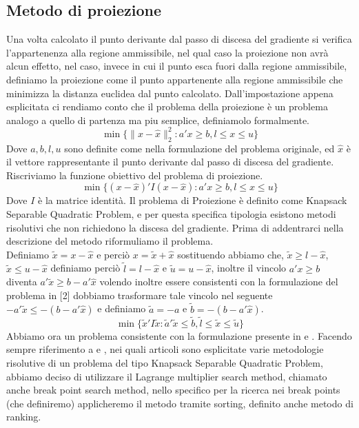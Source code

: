 \documentclass{article}
\begin{document}
\subsection{Metodo di proiezione}
Una volta calcolato il punto derivante dal passo di discesa del gradiente si verifica l'appartenenza alla regione ammissibile, nel qual caso la proiezione non avrà alcun effetto, nel caso, invece in cui il punto esca fuori dalla regione ammissibile, definiamo la proiezione come il punto appartenente alla regione ammissibile che minimizza la distanza euclidea dal punto calcolato. Dall'impostazione appena esplicitata ci rendiamo conto che il problema della proiezione è un problema analogo a quello di partenza ma piu semplice, definiamolo formalmente.
\[\min \{\|x - \hat{x} \|_2^2 : a'x \geq b, l \leq x \leq u \}\]
Dove $a, b, l, u$ sono definite come nella formulazione del problema originale, ed $\hat{x}$ è il vettore rappresentante il punto derivante dal passo di discesa del gradiente.\\
Riscriviamo la funzione obiettivo del problema di proiezione.
\[\min \{(x - \hat{x})'I(x - \hat{x}) : a'x \geq b, l \leq x \leq u \}\]
Dove $I$ è la matrice identità. Il problema di Proiezione è definito come Knapsack Separable Quadratic Problem, e per questa specifica tipologia esistono metodi risolutivi che non richiedono la discesa del gradiente. Prima di addentrarci nella descrizione del metodo riformuliamo il problema.\\
Definiamo $\widetilde{x} = x - \hat{x}$ e perciò $x = \widetilde{x} + \hat{x}$ sostituendo abbiamo che, $\widetilde{x} \geq l - \hat{x}$, $\widetilde{x} \leq u - \hat{x}$ definiamo perciò $\widetilde{l} = l - \hat{x}$ e $\widetilde{u} = u - \hat{x}$, inoltre il vincolo $a'x \geq b$ diventa $a'\widetilde{x} \geq b - a'\hat{x}$ volendo inoltre essere consistenti con la formulazione del problema in [2] dobbiamo trasformare tale vincolo nel seguente $-a'\widetilde{x} \leq -(b - a'\hat{x})$ e definiamo $\widetilde{a} = -a$ e $\widetilde{b} = -(b - a'\hat{x})$.
\[\min \{\widetilde{x}'I\widetilde{x} : \widetilde{a}'\widetilde{x} \leq \widetilde{b}, \widetilde{l} \leq \widetilde{x} \leq \widetilde{u} \}\]
Abbiamo ora un problema consistente con la formulazione presente in \cite{Jeong2014IndefiniteKS} e \cite{PATRIKSSON20081}. Facendo sempre riferimento a \cite{Jeong2014IndefiniteKS} e \cite{PATRIKSSON20081}, nei quali articoli sono esplicitate varie metodologie risolutive di un problema del tipo Knapsack Separable Quadratic Problem, abbiamo deciso di utilizzare il Lagrange multiplier search method, chiamato anche break point search method, nello specifico per la ricerca nei break points (che definiremo) applicheremo il metodo tramite sorting, definito anche metodo di ranking.\\
\end{document}
